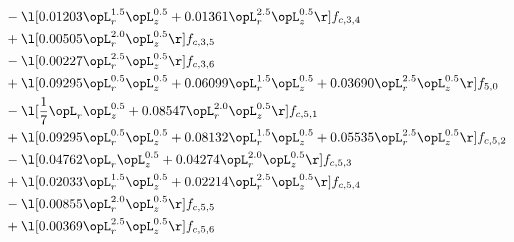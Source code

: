 \begin{alignat}{2}
& - \l[  0.01203 \opL_r^{1.5} \opL_z^{0.5} +  0.01361 \opL_r^{2.5} \opL_z^{0.5}  \r] f_{c,3,4} \nonumber \\ 
& + \l[  0.00505 \opL_r^{2.0} \opL_z^{0.5}  \r] f_{c,3,5} \nonumber \\ 
& - \l[  0.00227 \opL_r^{2.5} \opL_z^{0.5}  \r] f_{c,3,6} \nonumber \\ 
& + \l[  0.09295 \opL_r^{0.5} \opL_z^{0.5} +  0.06099 \opL_r^{1.5} \opL_z^{0.5} +  0.03690 \opL_r^{2.5} \opL_z^{0.5}  \r] f_{5,0} \nonumber \\ 
& - \l[ \frac{1}{7} \opL_r \opL_z^{0.5} +  0.08547 \opL_r^{2.0} \opL_z^{0.5}  \r] f_{c,5,1} \nonumber \\ 
& + \l[  0.09295 \opL_r^{0.5} \opL_z^{0.5} +  0.08132 \opL_r^{1.5} \opL_z^{0.5} +  0.05535 \opL_r^{2.5} \opL_z^{0.5}  \r] f_{c,5,2} \nonumber \\ 
& - \l[  0.04762 \opL_r \opL_z^{0.5} +  0.04274 \opL_r^{2.0} \opL_z^{0.5}  \r] f_{c,5,3} \nonumber \\ 
& + \l[  0.02033 \opL_r^{1.5} \opL_z^{0.5} +  0.02214 \opL_r^{2.5} \opL_z^{0.5}  \r] f_{c,5,4} \nonumber \\ 
& - \l[  0.00855 \opL_r^{2.0} \opL_z^{0.5}  \r] f_{c,5,5} \nonumber \\ 
& + \l[  0.00369 \opL_r^{2.5} \opL_z^{0.5}  \r] f_{c,5,6} \nonumber \\ 
\end{alignat} 


